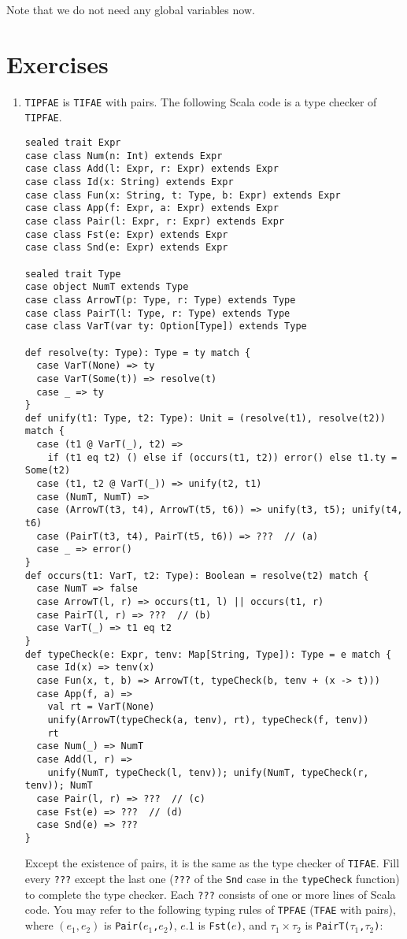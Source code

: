 Note that we do not need any global variables now.

\newcommand{\Dom}[1]{\mbox{Domain}(#1)}
\newcommand{\rulesep}{\quad}
\newcommand{\C}[1]{\texttt{#1}}

\section{Exercises}

\begin{enumerate}
\item
\C{TIPFAE} is \C{TIFAE} with pairs. The following Scala
code is a type checker of \C{TIPFAE}.
\begin{verbatim}
sealed trait Expr
case class Num(n: Int) extends Expr
case class Add(l: Expr, r: Expr) extends Expr
case class Id(x: String) extends Expr
case class Fun(x: String, t: Type, b: Expr) extends Expr
case class App(f: Expr, a: Expr) extends Expr
case class Pair(l: Expr, r: Expr) extends Expr
case class Fst(e: Expr) extends Expr
case class Snd(e: Expr) extends Expr

sealed trait Type
case object NumT extends Type
case class ArrowT(p: Type, r: Type) extends Type
case class PairT(l: Type, r: Type) extends Type
case class VarT(var ty: Option[Type]) extends Type

def resolve(ty: Type): Type = ty match {
  case VarT(None) => ty
  case VarT(Some(t)) => resolve(t)
  case _ => ty
}
def unify(t1: Type, t2: Type): Unit = (resolve(t1), resolve(t2)) match {
  case (t1 @ VarT(_), t2) =>
    if (t1 eq t2) () else if (occurs(t1, t2)) error() else t1.ty = Some(t2)
  case (t1, t2 @ VarT(_)) => unify(t2, t1)
  case (NumT, NumT) =>
  case (ArrowT(t3, t4), ArrowT(t5, t6)) => unify(t3, t5); unify(t4, t6)
  case (PairT(t3, t4), PairT(t5, t6)) => ???  // (a)
  case _ => error()
}
def occurs(t1: VarT, t2: Type): Boolean = resolve(t2) match {
  case NumT => false
  case ArrowT(l, r) => occurs(t1, l) || occurs(t1, r)
  case PairT(l, r) => ???  // (b)
  case VarT(_) => t1 eq t2
}
def typeCheck(e: Expr, tenv: Map[String, Type]): Type = e match {
  case Id(x) => tenv(x)
  case Fun(x, t, b) => ArrowT(t, typeCheck(b, tenv + (x -> t)))
  case App(f, a) =>
    val rt = VarT(None)
    unify(ArrowT(typeCheck(a, tenv), rt), typeCheck(f, tenv))
    rt
  case Num(_) => NumT
  case Add(l, r) =>
    unify(NumT, typeCheck(l, tenv)); unify(NumT, typeCheck(r, tenv)); NumT
  case Pair(l, r) => ???  // (c)
  case Fst(e) => ???  // (d)
  case Snd(e) => ???
}
\end{verbatim}
Except the existence of pairs, it is the same as the type checker of \C{TIFAE}.
Fill every \C{???} except the last one (\C{???} of the \C{Snd} case in the
\C{typeCheck} function) to complete the type checker. Each \C{???} consists
of one or more lines of Scala code. You may refer to the following typing rules
of \C{TPFAE} (\C{TFAE} with pairs), where $(e_1,e_2)$ is \C{Pair($e_1$,$e_2$)},
$e\textsf{.1}$ is \C{Fst($e$)}, and $\tau_1\times\tau_2$ is
\C{PairT($\tau_1$,$\tau_2$)}:


\end{enumerate}
